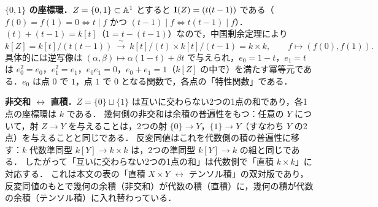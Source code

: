 \textbf{$\{0,1\}$ の座標環．}$Z=\{0,1\}\subset\mathbb{A}^1$ とすると $\mathbf{I}(Z)=(t(t-1))$ である（$f(0)=f(1)=0\iff t\mid f$ かつ $(t-1)\mid f\iff t(t-1)\mid f$）．
$(t)+(t-1)=k[t]$（$1=t-(t-1)$）なので，中国剰余定理により
\[
  k[Z]=k[t]/(t(t-1))\ \xrightarrow{\ \sim\ }\ k[t]/(t)\times k[t]/(t-1)=k\times k,\qquad f\mapsto(f(0),f(1)).
\]
具体的には逆写像は $(\alpha,\beta)\mapsto\alpha(1-t)+\beta t$ で与えられ，$e_0=1-t$，$e_1=t$ は $e_0^2=e_0$，$e_1^2=e_1$，$e_0e_1=0$，$e_0+e_1=1$（$k[Z]$ の中で）を満たす冪等元である．$e_0$ は点 $0$ で $1$，点 $1$ で $0$ となる関数で，各点の「特性関数」である．

\textbf{非交和 $\leftrightarrow$ 直積．}$Z=\{0\}\sqcup\{1\}$ は互いに交わらない2つの1点の和であり，各1点の座標環は $k$ である．
幾何側の非交和は余積の普遍性をもつ：任意の $Y$ について，射 $Z\to Y$ を与えることは，2つの射 $\{0\}\to Y$，$\{1\}\to Y$（すなわち $Y$ の2点）を与えることと同じである．
反変同値はこれを代数側の積の普遍性に移す：$k$ 代数準同型 $k[Y]\to k\times k$ は，2つの準同型 $k[Y]\to k$ の組と同じである．
したがって「互いに交わらない2つの1点の和」は代数側で「直積 $k\times k$」に対応する．
これは本文の表の「直積 $X\times Y$ $\leftrightarrow$ テンソル積」の双対版であり，反変同値のもとで幾何の余積（非交和）が代数の積（直積）に，幾何の積が代数の余積（テンソル積）に入れ替わっている．
